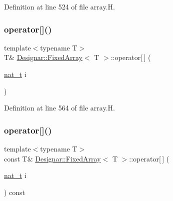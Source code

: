 Definition at line 524 of file array.\+H.

\mbox{\label{class_designar_1_1_fixed_array_a0116aa8effdf9fd0c56ef1a8c1fa2883}} 
\subsubsection{\texorpdfstring{operator[]()}{operator[]()}\hspace{0.1cm}{\footnotesize\ttfamily [1/2]}}
{\footnotesize\ttfamily template$<$typename T$>$ \\
T\& \hyperlink{class_designar_1_1_fixed_array}{Designar\+::\+Fixed\+Array}$<$ T $>$\+::operator\mbox{[}$\,$\mbox{]} (\begin{DoxyParamCaption}\item[{\hyperlink{namespace_designar_aa72662848b9f4815e7bf31a7cf3e33d1}{nat\+\_\+t}}]{i }\end{DoxyParamCaption})\hspace{0.3cm}{\ttfamily [inline]}}



Definition at line 564 of file array.\+H.

\mbox{\label{class_designar_1_1_fixed_array_aac0021d1ca6ff704f3d6967a509fff6b}} 
\subsubsection{\texorpdfstring{operator[]()}{operator[]()}\hspace{0.1cm}{\footnotesize\ttfamily [2/2]}}
{\footnotesize\ttfamily template$<$typename T$>$ \\
const T\& \hyperlink{class_designar_1_1_fixed_array}{Designar\+::\+Fixed\+Array}$<$ T $>$\+::operator\mbox{[}$\,$\mbox{]} (\begin{DoxyParamCaption}\item[{\hyperlink{namespace_designar_aa72662848b9f4815e7bf31a7cf3e33d1}{nat\+\_\+t}}]{i }\end{DoxyParamCaption}) const\hspace{0.3cm}{\ttfamily [inline]}}



